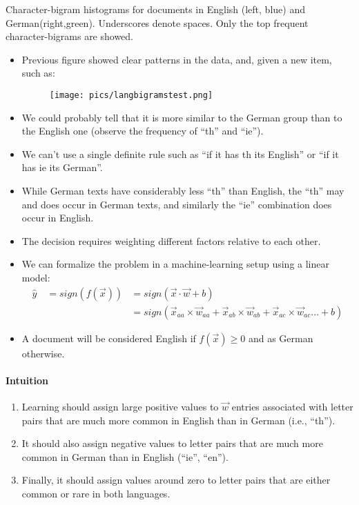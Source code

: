 Character-bigram histograms for documents in English (left, blue) and German(right,green). Underscores denote spaces. Only the top frequent character-bigrams are showed.



\begin{itemize}
\item Previous figure showed clear patterns in the data, and, given a new item, such as:

\begin{figure}[htb]
	\centering
	 \texttt{[image: pics/langbigramstest.png]}
\end{figure}
\item We could probably tell that it is more similar to the German group than to the English one (observe the frequency of ``th'' and ``ie'').
\item We can't use a single definite rule such as ``if it has th its English'' or ``if it has ie its German''.
\item While German texts have considerably less ``th'' than English, the ``th'' may and does occur in German texts, and similarly the ``ie'' combination does occur in English.
\item The decision requires weighting different factors relative to each other.
\item We can formalize the problem in a machine-learning setup using a linear model:
\begin{equation}
\begin{split}
\hat{y} \quad = sign(f(\vec{x})) & = sign(\vec{x}\cdot \vec{w} + b) \\ 
& = sign(\vec{x}_{aa}\times \vec{w}_{aa}+ \vec{x}_{ab}\times \vec{w}_{ab}+ \vec{x}_{ac}\times \vec{w}_{ac} \dots +b)
\end{split}
\end{equation}
\item A document will be considered English if $f(\vec{x}) \geq 0$  and as German otherwise.
\end{itemize}

\paragraph{Intuition}
\begin{enumerate}
\item Learning should assign large positive values to $\vec{w}$ entries associated with letter pairs that are much more common in English than in German (i.e., ``th'').
\item It should also assign negative values to letter pairs that are much more common in German than in English (``ie'', ``en'').
\item Finally, it should assign  values around zero to letter pairs that are either common or rare in both languages.
\end{enumerate}




